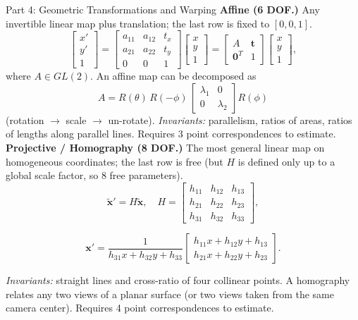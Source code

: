 \documentclass[letterpaper]{article}
\begin{document}
\begin{notes}{Part 4: Geometric Transformations and Warping}
\textbf{Affine (6 DOF.)} Any invertible linear map plus translation; the last row is fixed to $[0,0,1]$.
$$\begin{bmatrix}x'\\y'\\1\end{bmatrix} = \begin{bmatrix}a_{11}&a_{12}&t_x\\a_{21}&a_{22}&t_y\\0&0&1\end{bmatrix}\begin{bmatrix}x\\y\\1\end{bmatrix} = \begin{bmatrix}A&\mathbf{t}\\\mathbf{0}^T&1\end{bmatrix}\begin{bmatrix}x\\y\\1\end{bmatrix},$$
where $A\in GL(2)$. An affine map can be decomposed as 
$$A = R(\theta)\,R(-\phi)\,\begin{bmatrix}\lambda_1&0\\0&\lambda_2\end{bmatrix}R(\phi)$$ 
(rotation $\to$ scale $\to$ un-rotate). \emph{Invariants:} parallelism, ratios of areas, ratios of lengths along parallel lines. Requires 3 point correspondences to estimate.\\

\textbf{Projective / Homography (8 DOF.)} The most general linear map on homogeneous coordinates; the last row is free (but $H$ is defined only up to a global scale factor, so $8$ free parameters).
$$\tilde{\mathbf{x}}' = H\tilde{\mathbf{x}}, \quad H = \begin{bmatrix}h_{11}&h_{12}&h_{13}\\h_{21}&h_{22}&h_{23}\\h_{31}&h_{32}&h_{33}\end{bmatrix},$$

$$\mathbf{x}' = \frac{1}{h_{31}x+h_{32}y+h_{33}}\begin{bmatrix}h_{11}x+h_{12}y+h_{13}\\h_{21}x+h_{22}y+h_{23}\end{bmatrix}.$$

\emph{Invariants:} straight lines and cross-ratio of four collinear points. A homography relates any two views of a planar surface (or two views taken from the same camera center). Requires 4 point correspondences to estimate.


\end{notes}
\end{document}
